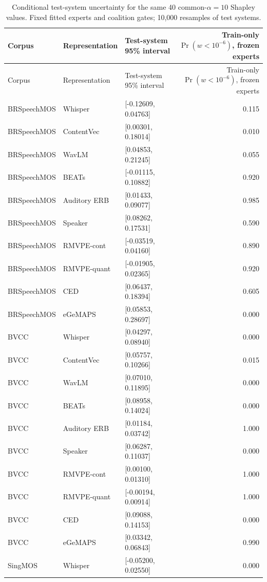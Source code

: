 \begin{longtable}{lllr}
\caption{Conditional test-system uncertainty for the same 40 common-$\alpha=10$ Shapley values. Fixed fitted experts and coalition gates; 10,000 resamples of test systems.}\label{tab:attribution-test-uncertainty}\\
\toprule
Corpus & Representation & Test-system 95\% interval & Train-only $\Pr(w<10^{-6})$, frozen experts \\
\midrule
\endfirsthead
\toprule
Corpus & Representation & Test-system 95\% interval & Train-only $\Pr(w<10^{-6})$, frozen experts \\
\midrule
\endhead
\bottomrule
\endfoot
BRSpeechMOS & Whisper & [-0.12609, 0.04763] & 0.115 \\
BRSpeechMOS & ContentVec & [0.00301, 0.18014] & 0.010 \\
BRSpeechMOS & WavLM & [0.04853, 0.21245] & 0.055 \\
BRSpeechMOS & BEATs & [-0.01115, 0.10882] & 0.920 \\
BRSpeechMOS & Auditory ERB & [0.01433, 0.09077] & 0.985 \\
BRSpeechMOS & Speaker & [0.08262, 0.17531] & 0.590 \\
BRSpeechMOS & RMVPE-cont & [-0.03519, 0.04160] & 0.890 \\
BRSpeechMOS & RMVPE-quant & [-0.01905, 0.02365] & 0.920 \\
BRSpeechMOS & CED & [0.06437, 0.18394] & 0.605 \\
BRSpeechMOS & eGeMAPS & [0.05853, 0.28697] & 0.000 \\
BVCC & Whisper & [0.04297, 0.08940] & 0.000 \\
BVCC & ContentVec & [0.05757, 0.10266] & 0.015 \\
BVCC & WavLM & [0.07010, 0.11895] & 0.000 \\
BVCC & BEATs & [0.08958, 0.14024] & 0.000 \\
BVCC & Auditory ERB & [0.01184, 0.03742] & 1.000 \\
BVCC & Speaker & [0.06287, 0.11037] & 0.000 \\
BVCC & RMVPE-cont & [0.00100, 0.01310] & 1.000 \\
BVCC & RMVPE-quant & [-0.00194, 0.00914] & 1.000 \\
BVCC & CED & [0.09088, 0.14153] & 0.000 \\
BVCC & eGeMAPS & [0.03342, 0.06843] & 0.990 \\
SingMOS & Whisper & [-0.05200, 0.02550] & 0.000 \\

\end{longtable}
